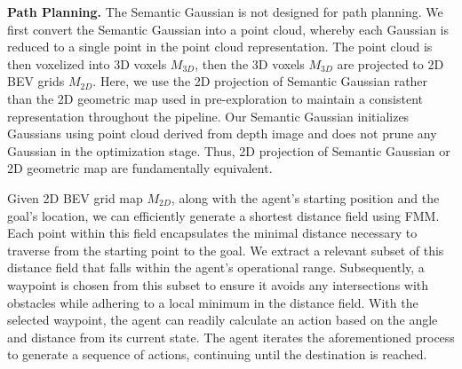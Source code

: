\textbf{Path Planning.} The Semantic Gaussian is not designed for path planning. We first convert the Semantic Gaussian into a point cloud, whereby each Gaussian is reduced to a single point in the point cloud representation. The point cloud is then voxelized into 3D voxels $M_{3D}$, then the 3D voxels $M_{3D}$ are projected to 2D BEV grids $M_{2D}$. Here, we use the 2D projection of Semantic Gaussian rather than the 2D geometric map used in pre-exploration to maintain a consistent representation throughout the pipeline. Our Semantic Gaussian initializes Gaussians using point cloud derived from depth image and does not prune any Gaussian in the optimization stage. Thus, 2D projection of Semantic Gaussian or 2D geometric map are fundamentally equivalent.

Given 2D BEV grid map $M_{2D}$, along with the agent's starting position and the goal's location, we can efficiently generate a shortest distance field using FMM. Each point within this field encapsulates the minimal distance necessary to traverse from the starting point to the goal.  We extract a relevant subset of this distance field that falls within the agent's operational range. Subsequently, a waypoint is chosen from this subset to ensure it avoids any intersections with obstacles while adhering to a local minimum in the distance field. With the selected waypoint, the agent can readily calculate an action based on the angle and distance from its current state. The agent iterates the aforementioned process to generate a sequence of actions, continuing until the destination is reached.



